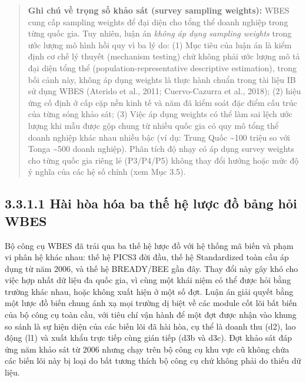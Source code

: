 \documentclass[
  a4paper,
  13pt]{extreport}
\begin{document}
\begin{quote}
\textbf{Ghi chú về trọng số khảo sát (survey sampling weights):} WBES
cung cấp sampling weights để đại diện cho tổng thể doanh nghiệp trong
từng quốc gia. Tuy nhiên, luận án \emph{không áp dụng sampling weights}
trong ước lượng mô hình hồi quy vì ba lý do: (1) Mục tiêu của luận án là
kiểm định cơ chế lý thuyết (mechanism testing) chứ không phải ước lượng
mô tả đại diện tổng thể (population-representative descriptive
estimation), trong bối cảnh này, không áp dụng weights là thực hành
chuẩn trong tài liệu IB sử dụng WBES (Aterido et al., 2011;
Cuervo-Cazurra et al., 2018); (2) hiệu ứng cố định ở cấp cặp nền kinh tế
và năm đã kiểm soát đặc điểm cấu trúc của từng sóng khảo sát; (3) Việc
áp dụng weights có thể làm sai lệch ước lượng khi mẫu được gộp chung từ
nhiều quốc gia có quy mô tổng thể doanh nghiệp khác nhau nhiều bậc (ví
dụ: Trung Quốc \textasciitilde100 triệu so với Tonga \textasciitilde500
doanh nghiệp). Phân tích độ nhạy có áp dụng survey weights cho từng quốc
gia riêng lẻ (P3/P4/P5) không thay đổi hướng hoặc mức độ ý nghĩa của các
hệ số chính (xem Mục 3.5).
\end{quote}

\hypertarget{huxe0i-huxf2a-huxf3a-ba-thux1ebf-hux1ec7-lux1b0ux1ee3c-ux111ux1ed3-bux1ea3ng-hux1ecfi-wbes}{%
\subsection{3.3.1.1 Hài hòa hóa ba thế hệ lược đồ bảng hỏi
WBES}\label{huxe0i-huxf2a-huxf3a-ba-thux1ebf-hux1ec7-lux1b0ux1ee3c-ux111ux1ed3-bux1ea3ng-hux1ecfi-wbes}}

Bộ công cụ WBES đã trải qua ba thế hệ lược đồ với hệ thống mã biến và
phạm vi phân hệ khác nhau: thế hệ PICS3 đời đầu, thế hệ Standardized
toàn cầu áp dụng từ năm 2006, và thế hệ BREADY/BEE gần đây. Thay đổi này
gây khó cho việc hợp nhất dữ liệu đa quốc gia, vì cùng một khái niệm có
thể được hỏi bằng trường khác nhau, hoặc không xuất hiện ở một số đợt.
Luận án giải quyết bằng một lược đồ biến chung ánh xạ mọi trường dị biệt
về các module cốt lõi bất biến của bộ công cụ toàn cầu, với tiêu chí vận
hành để một đợt được nhận vào khung so sánh là sự hiện diện của các biến
lõi đã hài hòa, cụ thể là doanh thu (d2), lao động (l1) và xuất khẩu
trực tiếp cùng gián tiếp (d3b và d3c). Đợt khảo sát đáp ứng năm khảo sát
từ 2006 nhưng chạy trên bộ công cụ khu vực cũ không chứa các biến lõi
này bị loại do bất tương thích bộ công cụ chứ không phải do thiếu dữ
liệu.
\end{document}
